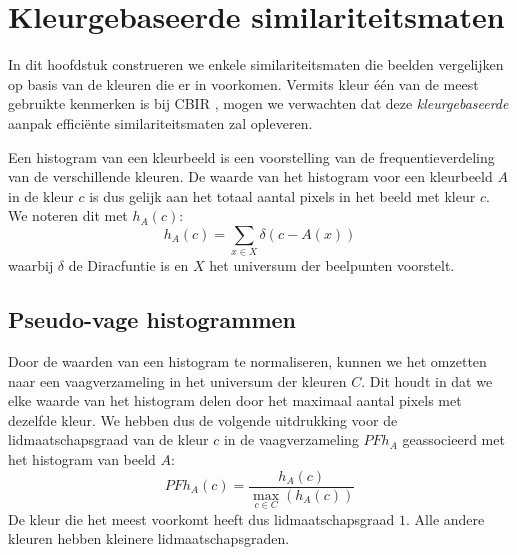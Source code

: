 \chapter{Kleurgebaseerde similariteitsmaten}

In dit hoofdstuk construeren we enkele similariteitsmaten die beelden 
vergelijken op basis van de kleuren die er in voorkomen. Vermits kleur \'e\'en 
van de meest gebruikte kenmerken is bij CBIR \cite{rui:image_retr}, mogen we 
verwachten dat deze \emph{kleurgebaseerde} aanpak effici\"ente 
similariteitsmaten zal opleveren. 

Een histogram van een kleurbeeld is een voorstelling van de frequentieverdeling 
van de verschillende kleuren. De waarde van het histogram voor een kleurbeeld 
$A$ in de kleur $c$ is dus gelijk aan het totaal aantal pixels in het beeld met 
kleur $c$. We noteren dit met $h_A(c)$: $$ h_A(c) = \sum_{x \in X} \delta (c - 
A(x)) $$ waarbij $\delta$ de Diracfuntie is en $X$ het universum der beelpunten 
voorstelt.


\section{Pseudo-vage histogrammen}

Door de waarden van een histogram te normaliseren, kunnen we het omzetten naar 
een vaagverzameling in het universum der kleuren $C$. Dit houdt in dat we elke 
waarde van het histogram delen door het maximaal aantal pixels met dezelfde 
kleur. We hebben dus de volgende uitdrukking voor de lidmaatschapsgraad van de 
kleur $c$ in de vaagverzameling $\mathit{PFh}_A$ geassocieerd met het histogram 
van beeld $A$: $$
\mathit{PFh}_A(c) = \frac{\displaystyle h_A(c)}{\displaystyle \max_{c \in C}(h_A(c))}
$$ De kleur die het meest voorkomt heeft dus lidmaatschapsgraad $1$. Alle 
andere kleuren hebben kleinere lidmaatschapsgraden.




